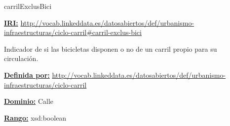 \begin{mybox}{carrilExclusBici}
\begin{flushleft}
\underline{\textbf{IRI:}}
\url{http://vocab.linkeddata.es/datosabiertos/def/urbanismo-infraestructuras/ciclo-carril#carril-exclus-bici}
\newline

Indicador de si las bicicletas disponen o no de un carril propio para su circulación.
\newline


\underline{\textbf{Definida por:}}
\url{http://vocab.linkeddata.es/datosabiertos/def/urbanismo-infraestructuras/ciclo-carril}
\newline

\underline{\textbf{Dominio:}}
	Calle
\newline

\underline{\textbf{Rango:}}
	xsd:boolean
\newline

\end{flushleft}
\end{mybox}































